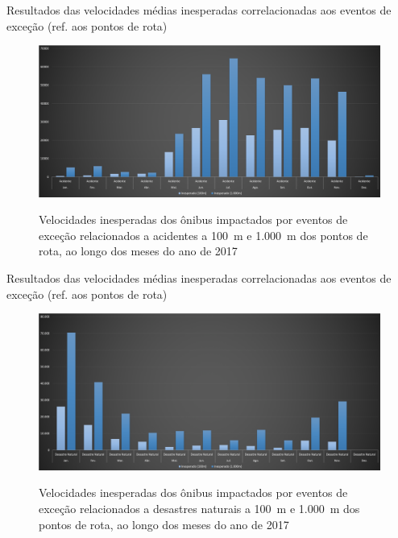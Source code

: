 \documentclass{beamer}
\begin{document}
\begin{frame}{Resultados das velocidades médias inesperadas correlacionadas aos eventos de exceção (ref. aos pontos de rota)}
    \begin{figure}[!htb]
	\centering
 	  \caption{Velocidades inesperadas dos ônibus impactados por eventos de exceção relacionados a acidentes a 100~m e 1.000~m dos pontos de rota, ao longo dos meses do ano de 2017}
		\includegraphics[width=0.8\linewidth]{apriori_analysis_shapes_accidents.png}
	\label{fig:apriori_analysis_shapes_accidents}
\end{figure}
\end{frame}
\begin{frame}{Resultados das velocidades médias inesperadas correlacionadas aos eventos de exceção (ref. aos pontos de rota)}
    \begin{figure}[!htb]
	\centering
 	  \caption{Velocidades inesperadas dos ônibus impactados por eventos de exceção relacionados a desastres naturais a 100~m e 1.000~m dos pontos de rota, ao longo dos meses do ano de 2017}
		\includegraphics[width=0.8\linewidth]{apriori_analysis_shapes_natural_disasters.png}
	\label{fig:apriori_analysis_shapes_natural_disasters}
\end{figure}
\end{frame}
\end{document}
